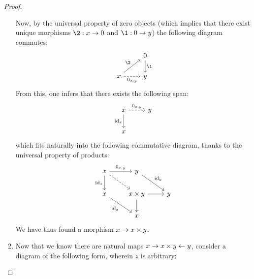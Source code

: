 \begin{proof}
\begin{enumerate}
                                Now, by the universal property of zero objects (which implies that there exist unique morphisms $\2: x \to 0$ and $\1: 0 \to y$) the following diagram commutes:
                                    $$
                                        \begin{tikzcd}
                                                                                               & 0 \arrow[d, "\1"] \\
                                            x \arrow[r, "{0_{x, y}}"', dashed] \arrow[ru, "\2"] & y                
                                        \end{tikzcd}
                                    $$
                                From this, one infers that there exists the following span:
                                    $$
                                        \begin{tikzcd}
                                            x \arrow[r, "{0_{x, y}}", dashed] \arrow[d, "\id_x"'] & y \\
                                            x                                                     &  
                                        \end{tikzcd}
                                    $$
                                which fits naturally into the following commutative diagram, thanks to the universal property of products:
                                    $$
                                        \begin{tikzcd}
                                        	x & y \\
                                        	x & {x \x y} & y \\
                                        	& x
                                        	\arrow["{0_{x, y}}", from=1-1, to=1-2]
                                        	\arrow["{\id_x}"', from=1-1, to=2-1]
                                        	\arrow[from=2-2, to=3-2]
                                        	\arrow[from=2-2, to=2-3]
                                        	\arrow["{\id_x}"', from=2-1, to=3-2]
                                        	\arrow["{\id_y}", from=1-2, to=2-3]
                                        	\arrow[dashed, from=1-1, to=2-2]
                                        \end{tikzcd}
                                    $$
                                We have thus found a morphism  $x \to x \x y$.
                                \item Now that we know there are natural maps $x \to x \x y \ot y$, consider a diagram of the following form, wherein $z$ is arbitrary:

\end{enumerate}
\end{proof}
